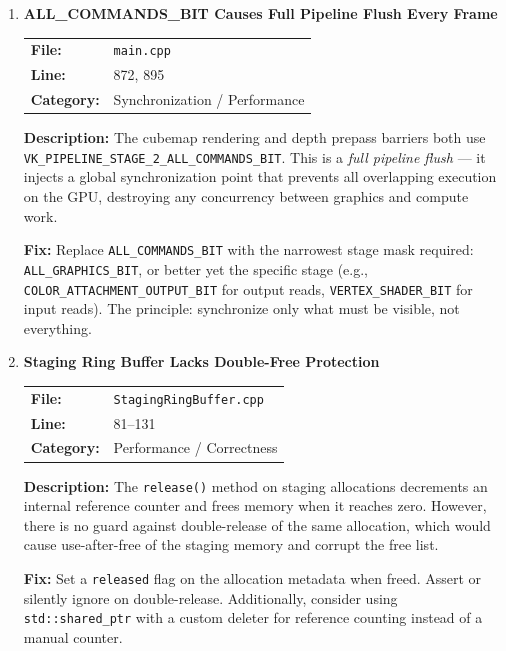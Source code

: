 \documentclass[a4paper,12pt]{article}
\newcommand{\severitybox}[2]{%
  \colorbox{#1}{\makebox[2.5cm][c]{\textcolor{white}{\textbf{#2}}}}%
}
\begin{document}
\begin{enumerate}[leftmargin=*]
\item[\textbf{[S2]}] \textbf{ALL\_COMMANDS\_BIT Causes Full Pipeline Flush Every Frame}
  \hfill \severitybox{highcolor}{HIGH}

  \begin{tabular}{ll}
    \textbf{File:} & \texttt{main.cpp} \\
    \textbf{Line:} & 872, 895 \\
    \textbf{Category:} & Synchronization / Performance \\
  \end{tabular}

  \textbf{Description:}
  The cubemap rendering and depth prepass barriers both use
  \texttt{VK\_PIPELINE\_STAGE\_2\_ALL\_COMMANDS\_BIT}. This is a
  \textit{full pipeline flush} — it injects a global synchronization point
  that prevents all overlapping execution on the GPU, destroying any
  concurrency between graphics and compute work.

  \textbf{Fix:}
  Replace \texttt{ALL\_COMMANDS\_BIT} with the narrowest stage mask required:
  \texttt{ALL\_GRAPHICS\_BIT}, or better yet the specific stage (e.g.,
  \texttt{COLOR\_ATTACHMENT\_OUTPUT\_BIT} for output reads,
  \texttt{VERTEX\_SHADER\_BIT} for input reads). The principle: synchronize
  only what must be visible, not everything.

\item[\textbf{[P1]}] \textbf{Staging Ring Buffer Lacks Double-Free Protection}
  \hfill \severitybox{highcolor}{HIGH}

  \begin{tabular}{ll}
    \textbf{File:} & \texttt{StagingRingBuffer.cpp} \\
    \textbf{Line:} & 81--131 \\
    \textbf{Category:} & Performance / Correctness \\
  \end{tabular}

  \textbf{Description:}
  The \texttt{release()} method on staging allocations decrements an internal
  reference counter and frees memory when it reaches zero. However, there is
  no guard against double-release of the same allocation, which would cause
  use-after-free of the staging memory and corrupt the free list.

  \textbf{Fix:}
  Set a \texttt{released} flag on the allocation metadata when freed.
  Assert or silently ignore on double-release. Additionally, consider
  using \texttt{std::shared\_ptr} with a custom deleter for reference
  counting instead of a manual counter.

\end{enumerate}
\end{document}
